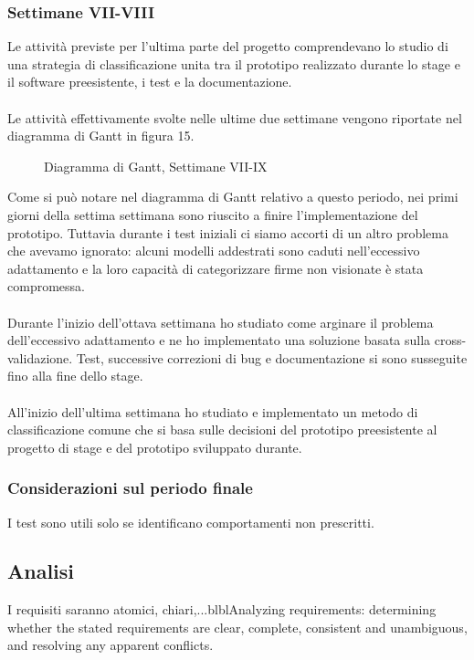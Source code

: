 \subsubsection{Settimane VII-VIII}
\label{3.1.4}
Le attività previste per l'ultima parte del progetto comprendevano lo studio di una strategia di classificazione unita tra il prototipo realizzato durante lo stage e il software preesistente, i test e la documentazione.\\\\
Le attività effettivamente svolte nelle ultime due settimane vengono riportate nel diagramma di Gantt in figura 15.
\begin{figure}[H]
\centering
\noindent{}
\caption{Diagramma di Gantt, Settimane VII-IX}
\end{figure}
Come si può notare nel diagramma di Gantt relativo a questo periodo, nei primi giorni della settima settimana sono riuscito a finire l'implementazione del prototipo. Tuttavia durante i test iniziali ci siamo accorti di un altro problema che avevamo ignorato: alcuni modelli addestrati sono caduti nell'eccessivo adattamento e la loro capacità di categorizzare firme non visionate è stata compromessa.\\\\
Durante l'inizio dell'ottava settimana ho studiato come arginare il problema dell'eccessivo adattamento e ne ho implementato una soluzione basata sulla cross-validazione. Test, successive correzioni di bug e documentazione si sono susseguite fino alla fine dello stage.\\\\
All'inizio dell'ultima settimana ho studiato e implementato un metodo di classificazione comune che si basa sulle decisioni del prototipo preesistente al progetto di stage e del prototipo sviluppato durante.
\subsubsection*{Considerazioni sul periodo finale}
\label{3.1.4.1}
I test sono utili solo se identificano comportamenti non prescritti.
\subsection{Analisi}
\label{3.2}
I requisiti saranno atomici, chiari,...blblAnalyzing requirements: determining whether the stated requirements are clear, complete, consistent and unambiguous, and resolving any apparent conflicts.
